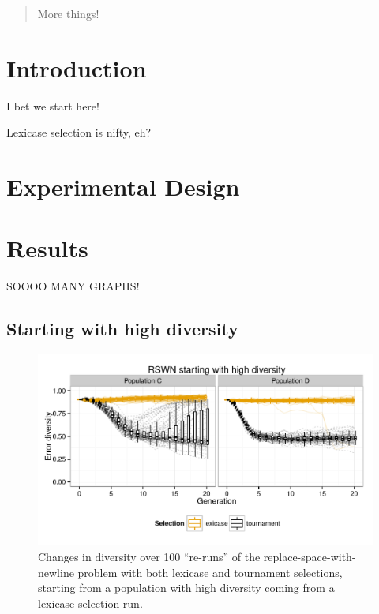 \documentclass{sig-alternate-05-2015}
\begin{document}
\maketitle
\begin{abstract}
More things!
\end{abstract}

%
%
\printccsdesc



\section{Introduction}
\label{sec:introduction}

I bet we start here!

Lexicase selection \cite{Spector:2012:GECCOcompANEW} is nifty, eh?

\section{Experimental Design}

\section{Results}
\label{sec:results}

SOOOO MANY GRAPHS!

\subsection{Starting with high diversity}
\label{sec:highDiversityResults}

\begin{figure}
	\includegraphics{../figures/RSWN_high_diversity}
	\vspace{-1 cm}
	\caption{Changes in diversity over 100 ``re-runs'' of the replace-space-with-newline problem with both lexicase and tournament selections, starting from a population with high diversity coming from a lexicase selection run.}
	\label{fig:RSWNhighDiversity}
\end{figure}
\end{document}
